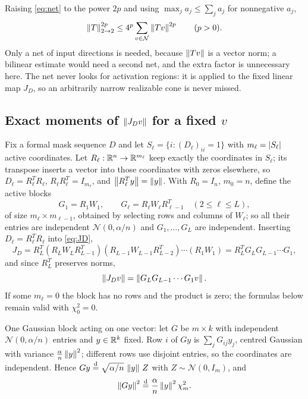 Raising \cref{eq:net} to the power $2p$ and using $\max_ja_j\le\sum_ja_j$ for nonnegative $a_j$,
\begin{equation}\label{eq:net-moment}
\left\lVert T\right\rVert_{2\to 2}^{2p}\le 4^p\sum_{v\in\mathcal{N}}\left\lVert Tv\right\rVert^{2p}\qquad(p>0).
\end{equation}
Only a net of input directions is needed, because $\left\lVert Tv\right\rVert$ is a vector norm; a bilinear estimate would need a second net, and the extra factor is unnecessary here. The net never looks for activation regions: it is applied to the fixed linear map $J_D$, so an arbitrarily narrow realizable cone is never missed.

\subsection{Exact moments of $\left\lVert J_Dv\right\rVert$ for a fixed $v$}

Fix a formal mask sequence $D$ and let $S_\ell=\{i:(D_\ell)_{ii}=1\}$ with $m_\ell=\left\lvert S_\ell\right\rvert$ active coordinates. Let $R_\ell:\mathbb{R}^n\to\mathbb{R}^{m_\ell}$ keep exactly the coordinates in $S_\ell$; its transpose inserts a vector into those coordinates with zeros elsewhere, so $D_\ell=R_\ell^TR_\ell$, $R_\ell R_\ell^T=I_{m_\ell}$, and $\left\lVert R_\ell^Ty\right\rVert=\left\lVert y\right\rVert$. With $R_0=I_n$, $m_0=n$, define the active blocks
\[
G_1=R_1W_1,\qquad G_\ell=R_\ell W_\ell R_{\ell-1}^T\quad(2\le\ell\le L),
\]
of size $m_\ell\times m_{\ell-1}$, obtained by selecting rows and columns of $W_\ell$; so all their entries are independent $\mathcal N(0,\alpha/n)$ and $G_1,\dots,G_L$ are independent. Inserting $D_\ell=R_\ell^TR_\ell$ into \cref{eq:JD},
\[
J_D=R_L^T(R_LW_LR_{L-1}^T)(R_{L-1}W_{L-1}R_{L-2}^T)\cdots(R_1W_1)=R_L^TG_LG_{L-1}\cdots G_1,
\]
and since $R_L^T$ preserves norms,
\begin{equation}\label{eq:JDv}
\left\lVert J_Dv\right\rVert=\left\lVert G_LG_{L-1}\cdots G_1v\right\rVert.
\end{equation}
If some $m_\ell=0$ the block has no rows and the product is zero; the formulas below remain valid with $\chi^2_0=0$.

One Gaussian block acting on one vector: let $G$ be $m\times k$ with independent $\mathcal N(0,\alpha/n)$ entries and $y\in\mathbb{R}^k$ fixed. Row $i$ of $Gy$ is $\sum_jG_{ij}y_j$, centred Gaussian with variance $\frac\alpha n\left\lVert y\right\rVert^2$; different rows use disjoint entries, so the coordinates are independent. Hence $Gy\overset{\mathrm{d}}{=}\sqrt{\alpha/n}\,\left\lVert y\right\rVert\,Z$ with $Z\sim\mathcal N(0,I_m)$, and
\begin{equation}\label{eq:one-block}
\left\lVert Gy\right\rVert^2\overset{\mathrm{d}}{=}\frac\alpha n\left\lVert y\right\rVert^2\chi^2_m .
\end{equation}

